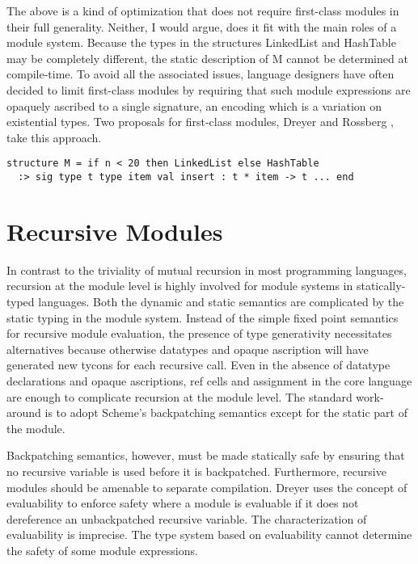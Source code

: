 The above is a kind of optimization that does not require first-class modules in their full generality. Neither, I would argue, does it fit with the main roles of a module system. Because the types in the structures LinkedList and HashTable may be completely different, the static description of M cannot be determined at compile-time. To avoid all the associated issues, language designers have often decided to limit first-class modules by requiring that such module expressions are opaquely ascribed to a single signature, an encoding which is a variation on existential types. Two proposals for first-class modules, Dreyer \cite{dreyerthesis} and Rossberg \cite{rossberg06}, take this approach. 

\begin{lstlisting}
structure M = if n < 20 then LinkedList else HashTable 
  :> sig type t type item val insert : t * item -> t ... end 	
\end{lstlisting}



\section{Recursive Modules}
In contrast to the triviality of mutual recursion in most programming languages, recursion at the module level is highly involved for module systems in statically-typed languages. Both the dynamic and static semantics are complicated by the static typing in the module system. Instead of the simple fixed point semantics for recursive module evaluation, the presence of type generativity necessitates alternatives because otherwise datatypes and opaque ascription will have generated new tycons for each recursive call. Even in the absence of datatype declarations and opaque ascriptions, ref cells and assignment in the core language are enough to complicate recursion at the module level. The standard work-around is to adopt Scheme's backpatching semantics except for the static part of the module. 

Backpatching semantics, however, must be made statically safe by ensuring that no recursive variable is used before it is backpatched. Furthermore, recursive modules should be amenable to separate compilation. Dreyer \cite{dreyerthesis} uses the concept of evaluability to enforce safety where a module is evaluable if it does not dereference an unbackpatched recursive variable. The characterization of evaluability is imprecise. The type system based on evaluability cannot determine the safety of some module expressions. 

